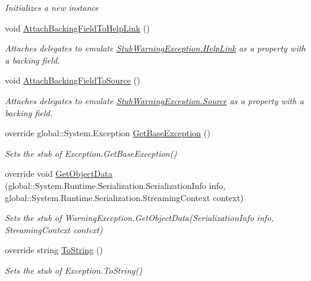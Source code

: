 \begin{DoxyCompactItemize}
\begin{DoxyCompactList}\small\item\em Initializes a new instance\end{DoxyCompactList}\item 
void \hyperlink{class_system_1_1_component_model_1_1_fakes_1_1_stub_warning_exception_a82f87348e1670dabc4ebc544c67542d1}{Attach\-Backing\-Field\-To\-Help\-Link} ()
\begin{DoxyCompactList}\small\item\em Attaches delegates to emulate \hyperlink{class_system_1_1_component_model_1_1_fakes_1_1_stub_warning_exception_ae1f39418742490663d5e4f04cef69989}{Stub\-Warning\-Exception.\-Help\-Link} as a property with a backing field.\end{DoxyCompactList}\item 
void \hyperlink{class_system_1_1_component_model_1_1_fakes_1_1_stub_warning_exception_ac38c3afba722d82f3a3529bf0f81e749}{Attach\-Backing\-Field\-To\-Source} ()
\begin{DoxyCompactList}\small\item\em Attaches delegates to emulate \hyperlink{class_system_1_1_component_model_1_1_fakes_1_1_stub_warning_exception_a95c34d123a793dcdaa46eec33b50b8d6}{Stub\-Warning\-Exception.\-Source} as a property with a backing field.\end{DoxyCompactList}\item 
override global\-::\-System.\-Exception \hyperlink{class_system_1_1_component_model_1_1_fakes_1_1_stub_warning_exception_ac300b5eaf500149d33a6c4958122fbd9}{Get\-Base\-Exception} ()
\begin{DoxyCompactList}\small\item\em Sets the stub of Exception.\-Get\-Base\-Exception()\end{DoxyCompactList}\item 
override void \hyperlink{class_system_1_1_component_model_1_1_fakes_1_1_stub_warning_exception_a32ba905b7ea562bae0d17cf45f04b0f0}{Get\-Object\-Data} (global\-::\-System.\-Runtime.\-Serialization.\-Serialization\-Info info, global\-::\-System.\-Runtime.\-Serialization.\-Streaming\-Context context)
\begin{DoxyCompactList}\small\item\em Sets the stub of Warning\-Exception.\-Get\-Object\-Data(\-Serialization\-Info info, Streaming\-Context context)\end{DoxyCompactList}\item 
override string \hyperlink{class_system_1_1_component_model_1_1_fakes_1_1_stub_warning_exception_ac3952eba28bcdbc1ebb81258fedbf1a3}{To\-String} ()
\begin{DoxyCompactList}\small\item\em Sets the stub of Exception.\-To\-String()\end{DoxyCompactList}\end{DoxyCompactItemize}
